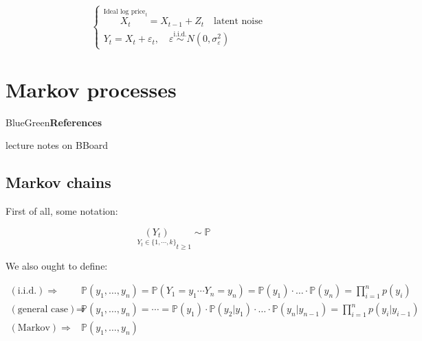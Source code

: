 \documentclass[dvipsnames,12pt]{book}
\begin{document}
            \begin{example}

                \begin{equation}
                    \begin{cases}
                        \overset{\text{Ideal log price}_{t}}{X_t}= X_{t-1} + Z_t \quad \text{latent noise} \\
                        Y_t = X_t + \varepsilon_t, \quad \varepsilon \overset{\text{i.i.d.}}{\sim} N(0,\sigma^2_{\varepsilon})
                    \end{cases}
                \end{equation}
                
            \end{example}
            

    \chapter{Markov processes}

            \begin{mybox}{BlueGreen}{\textbf{References}}

                lecture notes on BBoard
                
            \end{mybox}

        \section{Markov chains}

                First of all, some notation:

                \[
                \underset{Y_t \in \{ 1,\cdots,k \} }{(Y_t)}_{t \geq 1} \sim \mathbb{P} \quad 
                \]

                We also ought to define:  

                \begin{align}
                    (\text{i.i.d.}) \Rightarrow &  \mathbb{P} (y_1, \ldots, y_n) = \mathbb{P} (Y_1 = y_1 \cdots Y_n = y_n) = \mathbb{P} (y_1) \cdot \ldots \cdot \mathbb{P} (y_n) = \prod^n_{i=1} p(y_i) \\
                    (\text{general case}) \Rightarrow & \mathbb{P} (y_1, \ldots, y_n) = \cdots = \mathbb{P} (y_1) \cdot \mathbb{P} (y_2 | y_1) \cdot \ldots \cdot \mathbb{P} (y_n | y_{n-1}) = \prod^n_{i=1} p(y_i | y_{i-1}) \\
                    (\text{Markov}) \Rightarrow & \mathbb{P} (y_1, \ldots, y_n) 
                \end{align}
\end{document}
